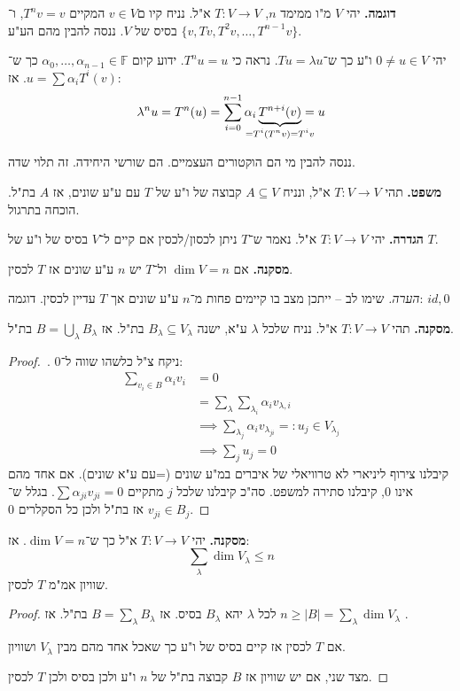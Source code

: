 \documentclass[]{article}
\newcommand\F         {\mathbb{F}}
\newcommand\co        {\colon}
\newcommand\ag        {\alpha}
\renewcommand\lg      {\lambda}
\begin{document}
	\textbf{דוגמה.}
	יהי $V$ מ"ו ממימד $n$, $T \co V \to V$ א"ל. נניח קיו ם$v \in V $ המקיים $T^nv = v$, ו־$\{v, Tv, T^2v, \dots, T^{n - 1}v\}$ בסיס של $V$. ננסה להבין מהם הע"ע. 
	
	יהי $0 \neq u \in V$ ו"ע כך ש־$Tu = \lg u$. נראה כי $T^nu = u$. ידוע קיום $\ag_0, \dots, \ag_{n - 1} \in \F$ כך ש־$u = \sum \ag_iT^i(v)$. אז: 
	\[ \lg^nu = T^n(u) = \sum_{i = 0}^{n - 1}\ag_i\underbrace{T^{n + i}(v)}_{\mathclap{= T^i(T^nv) = T^iv}} = u \]
	
	ננסה להבין מי הם הוקטורים העצמיים. הם שורשי היחידה. זה תלוי שדה. 
	
	\textbf{משפט. }תהי $T \co V \to V$ א"ל, ונניח $A \subseteq V$ קבוצה של ו"ע של $T$ עם ע"ע שונים, אז $A$ בת"ל. הוכחה בתרגול. 
	
	\textbf{הגדרה. }יהי $T \co V \to V$ א"ל. נאמר ש־$T$ ניתן לכסון/לכסין אם קיים ל־$V$ בסיס של ו"ע של $T$. 
	
	\textbf{מסקנה. }אם $\dim V = n$ ול־$T$ יש $n$ ע"ע שונים אז $T$ לכסין. 
	
	\textit{הערה. }שימו לב – ייתכן מצב בו קיימים פחות מ־$n$ ע"ע שונים אך $T$ עדיין לכסין. דוגמה: $id, 0$
	
	\textbf{מסקנה. }תהי $T \co V \to V$ א"ל. נניח שלכל $\lg$ ע"א, ישנה $B_\lg \subseteq V_\lg$ בת"ל. אז $B = \bigcup_{\lg}B_\lg$ בת"ל. 
	
	\begin{proof}\,\!. ניקח צ"ל כלשהו שווה ל־0: 
		\begin{align*}
			\sum_{v_i \in B} \ag_iv_i &= 0 \\
			&= \sum_{\lg}\sum_{\lg_i}\ag_iv_{\lg, i} \\
			&\implies \sum_{\lg_j}\ag_i v_{\lg_{ji}} =: u_j \in V_{\lg_j} \\
			&\implies \sum_{j}u_j = 0
		\end{align*}
			קיבלנו צירוף ליניארי לא טרוויאלי של איברים במ"ע שונים (=עם ע"א שונים). אם אחד מהם אינו 0, קיבלנו סתירה למשפט. סה"כ קיבלנו שלכל $j$ מתקיים $\sum \ag_{ji}v_{ji} = 0$. בגלל ש־$v_{ji} \in B_j$ אז בת"ל ולכן כל הסקלרים 0. 
	\end{proof}

	\textbf{מסקנה. }יהי $T \co V \to V$ א"ל כך ש־$\dim V = n$. אז: 
	\[ \sum_\lg \dim V_\lg \le n \]
	שוויון אמ"מ $T$ לכסין. 
	
	\begin{proof}
		לכל $\lg$ יהא $B_\lg$ בסיס. אז $B = \sum_{\lg}B_\lg$ בת"ל. אז $n \ge |B| = \sum_\lg \dim V_\lg$ . 
		
		אם $T$ לכסין אז קיים בסיס של ו"ע כך שאכל אחד מהם מבין $V_\lg$ ושוויון. 
		
		מצד שני, אם יש שוויון אז $B$ קבוצה בת"ל של $n$ ו"ע ולכן בסיס ולכן $T$ לכסין. 
	\end{proof}
	
\end{document}
